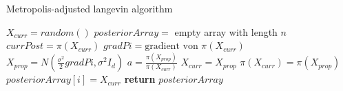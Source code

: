 \begin{algorithm}
    \caption{Metropolis-adjusted langevin algorithm}
    \label{alg:MALA}
    \begin{algorithmic}[1] 
            \State $X_{curr} = random()$ 
            \State $posteriorArray = $ empty array with length $n$
            \State $currPost = \pi(X_{curr})$
                \State $gradPi = \text{gradient von $\pi(X_{curr})$}$
                \State $X_{prop} = N(\frac{\sigma^2}{2} gradPi, \sigma^2I_d)$
                \State $a = \frac{\pi(X_{prop})}{\pi(X_{curr})}$
                    \State $X_{curr} = X_{prop}$
                    \State $\pi(X_{curr}) = \pi(X_{prop})$
                \EndIf
                \State $posteriorArray[i] = X_{curr}$
            \EndFor
            \State \textbf{return} $posteriorArray$
        \EndFunction
    \end{algorithmic}
\end{algorithm}

